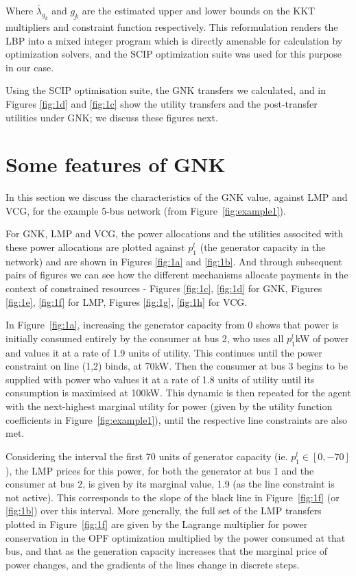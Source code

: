 Where $\bar{\lambda}_{g_k}$ and $\underline{g_k}$ are the estimated upper and lower bounds on the KKT multipliers and constraint function respectively.
This reformulation renders the LBP into a mixed integer program which is directly amenable for calculation by optimization solvers, and the SCIP optimization suite \cite{MaherFischerGallyetal.2017} was used for this purpose in our case.

Using the SCIP optimisation suite, the GNK transfers we calculated, and in Figures \ref{fig:1d} and \ref{fig:1c} show the utility transfers and the post-transfer utilities under GNK; we discuss these figures next.


\section{Some features of GNK}\label{sec:features}

In this section we discuss the characteristics of the GNK value, against LMP and VCG, for the example 5-bus network (from Figure~\ref{fig:example1}).

For GNK, LMP and VCG, the power allocations and the utilities associted with these power allocations are plotted against $p_1^l$ (the generator capacity in the network) and are shown in Figures \ref{fig:1a} and \ref{fig:1b}.
And through subsequent pairs of figures we can see how the different mechanisms allocate payments in the context of constrained resources - Figures \ref{fig:1c}, \ref{fig:1d} for GNK, Figures \ref{fig:1e}, \ref{fig:1f} for LMP, Figures \ref{fig:1g}, \ref{fig:1h} for VCG.

\iffigures
% 

\fi

In Figure~\ref{fig:1a}, increasing the generator capacity from $0$ shows that power is initially consumed entirely by the consumer at bus 2, 
who uses all $p_1^l$kW of power and values it at a rate of 1.9 units of utility. This continues until the power constraint on line (1,2) binds, at 70kW.
Then the consumer at bus 3 begins to be supplied with power who values it at a rate of 1.8 units of utility until its consumption is maximised at 100kW. 
This dynamic is then repeated for the agent with the next-highest marginal utility for power (given by the utility function coefficients in Figure~\ref{fig:example1}), until the respective line constraints are also met.

Considering the interval the first 70 units of generator capacity (ie. $p_1^l \in [0,-70]$), the LMP prices for this power, for both the generator at bus 1 and the consumer at bus 2, is given by its marginal value, 1.9 (as the line constraint is not active). This corresponds to the slope of the black line in Figure~\ref{fig:1f} (or \ref{fig:1b}) over this interval. 
More generally, the full set of the LMP transfers plotted in Figure~\ref{fig:1f} are given by the Lagrange multiplier for power conservation in the OPF optimization multiplied by the power consumed at that bus, and that as the generation capacity increases that the marginal price of power changes, and the gradients of the lines change in discrete steps.

